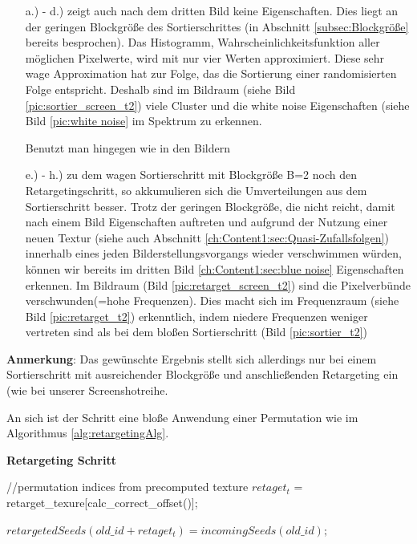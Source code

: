 \begin{itemize}
    \item[a.) - d.)] zeigt auch nach dem dritten Bild keine  Eigenschaften.
                     Dies liegt an der geringen Blockgröße des Sortierschrittes 
                     (in Abschnitt \ref{subsec:Blockgröße} bereits besprochen). Das Histogramm, Wahrscheinlichkeitsfunktion
                     aller möglichen Pixelwerte, wird mit nur vier Werten approximiert. Diese sehr wage Approximation 
                     hat zur Folge, das die Sortierung einer randomisierten Folge entspricht. Deshalb sind im Bildraum
                     (siehe Bild \ref{pic:sortier_screen_t2}) viele Cluster und die white noise Eigenschaften 
                     (siehe Bild \ref{pic:white noise} im Spektrum zu erkennen.
                     \par 
                    Benutzt man hingegen wie in den Bildern  
    \item[e.) - h.)] zu dem wagen Sortierschritt mit Blockgröße B=2 noch den Retargetingschritt, so akkumulieren sich die 
                    Umverteilungen aus dem Sortierschritt besser. Trotz der geringen Blockgröße, die nicht reicht, damit nach einem 
                    Bild  Eigenschaften auftreten und aufgrund der Nutzung einer neuen 
                    Textur (siehe auch Abschnitt \ref{ch:Content1:sec:Quasi-Zufallsfolgen}) innerhalb eines jeden 
                    Bilderstellungsvorgangs wieder verschwimmen würden, können wir bereits im dritten Bild 
                    \ref{ch:Content1:sec:blue noise} Eigenschaften erkennen. Im Bildraum (Bild \ref{pic:retarget_screen_t2})
                    sind die Pixelverbünde verschwunden(=hohe Frequenzen). Dies macht sich im Frequenzraum 
                    (siehe Bild \ref{pic:retarget_t2}) erkenntlich, indem niedere Frequenzen weniger vertreten sind 
                    als bei dem bloßen Sortierschritt (Bild \ref{pic:sortier_t2})
\end{itemize}

\textbf{Anmerkung}: Das gewünschte Ergebnis stellt sich allerdings nur bei einem Sortierschritt mit ausreichender Blockgröße und 
anschließenden Retargeting ein (wie bei unserer Screenshotreihe.

An sich ist der Schritt eine bloße Anwendung einer Permutation wie im Algorithmus \ref{alg:retargetingAlg}.

\begin{algorithm}[H]
    \caption{\textbf{Retargeting Schritt}}
    \begin{algorithmic}[1]
        \State //permutation indices from precomputed texture
        \State $retaget_{t}$ = retarget\_texure[calc\_correct\_offset()];
        
        \State $retargetedSeeds(old\_id + retaget_{t}) = incomingSeeds(old\_id);$
        
    \end{algorithmic}
    \label{alg:retargetingAlg}
\end{algorithm}

